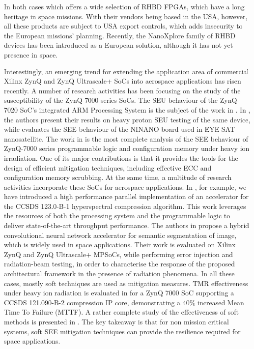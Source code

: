 In both cases which offers a wide selection of RHBD FPGAs, which have a long heritage in space missions. With their vendors being based in the USA, however, all these products are subject to USA export controls, which adds insecurity to the European missions' planning. Recently, the NanoXplore family of RHBD devices has been introduced as a European solution, although it has not yet presence in space.\par
Interestingly, an emerging trend for extending the application area of commercial Xilinx ZynQ and ZynQ Ultrascale+ SoCs into aerospace applications has risen recently. A number of research activities has been focusing on the study of the susceptibility of the ZynQ-7000 series SoCs. The SEU behaviour of the ZynQ-7020 SoC's integrated ARM Processing System is the subject of the work in \cite{Hiemstra2015}. In \cite{Tambara15}, the authors present their results on heavy proton SEU testing of the same device, while \cite{Bezerra17} evaluates the SEE behaviour of the NINANO board used in EYE-SAT nanosatellite. The work in \cite{Vlagkoulis21} is the most complete analysis of the SEE behaviour of ZynQ-7000 series programmable logic and configuration memory under heavy ion irradiation. One of its major contributions is that it provides the tools for the design of efficient mitigation techniques, including effective ECC and configuration memory scrubbing. At the same time, a multitude of research activities incorporate these SoCs for aerospace applications. In \cite{Tsigkanos2020}, for example, we have introduced a high performance parallel implementation of an accelerator for the CCSDS 123.0-B-1 hyperspectral compression algorithm. This work leverages the resources of both the processing system and the programmable logic to deliver state-of-the-art throughput performance. The authors in \cite{Sabogal19} propose a hybrid convolutional neural network accelerator for semantic segmentation of image, which is widely used in space applications. Their work is evaluated on Xilinx ZynQ and ZynQ Ultrascale+ MPSoCs, while performing error injection and radiation-beam testing, in order to characterise the response of the proposed architectural framework in the presence of radiation phenomena. In all these cases, mostly soft techniques are used as mitigation measures. TMR effectiveness under heavy ion radiation is evaluated in \cite{Sanchez19} for a ZynQ 7000 SoC supporting a  CCSDS 121.090-B-2 compression IP core, demonstrating a 40\% increased Mean Time To Failure (MTTF). A rather complete study of the effectiveness of soft methods is presented in \cite{Kibar19}. The key takeaway is that for non mission critical systems, soft SEE mitigation techniques can provide the resilience required for space applications.\par
